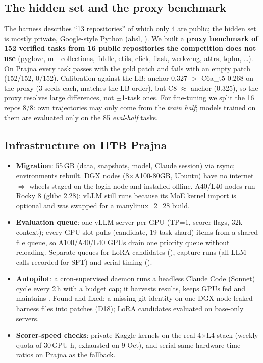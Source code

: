 \subsection{The hidden set and the proxy benchmark}
The harness describes ``13 repositories'' of which only 4 are public; the hidden set is mostly private, Google-style Python
(absl, ). We built a \textbf{proxy benchmark of 152 verified tasks from 16 public repositories the competition does
not use} (pyglove, ml\_collections, fiddle, etils, click, flask, werkzeug, attrs, tqdm, \dots). On Prajna every task passes with the gold
patch and fails with an empty patch (152/152, 0/152). Calibration against the LB: anchor 0.327 $>$ C6a\_t5 0.268 on the proxy (3
seeds each, matches the LB order), but C8 $\approx$ anchor (0.325), so the proxy resolves large differences, not $\pm$1-task ones.
For fine-tuning we split the 16 repos 8/8: own trajectories may only come from the \emph{train half}; models trained on them are
evaluated only on the 85 \emph{eval-half} tasks.

\subsection{Infrastructure on IITB Prajna}
\begin{itemize}
\item \textbf{Migration}: 55\,GB (data, snapshots, model, Claude session) via rsync; environments rebuilt. DGX nodes (8$\times$A100-80GB,
Ubuntu) have no internet $\Rightarrow$ wheels staged on the login node and installed offline. A40/L40 nodes run Rocky 8 (glibc 2.28):
vLLM still runs because its MoE kernel import is optional and  was swapped for a manylinux\_2\_28 build.
\item \textbf{Evaluation queue}: one vLLM server per GPU (TP=1, scorer flags, 32k context); every GPU slot pulls
(candidate, 19-task shard) items from a shared file queue, so A100/A40/L40 GPUs drain one priority queue without reloading.
Separate queues for LoRA candidates (), capture runs (all LLM calls recorded for SFT) and serial timing ().
\item \textbf{Autopilot}: a cron-supervised daemon runs a headless Claude Code (Sonnet) cycle every 2\,h with a budget cap; it harvests
results, keeps GPUs fed and maintains . Found and fixed: a missing git identity on one DGX node leaked
harness files into patches (D18); LoRA candidates evaluated on base-only servers.
\item \textbf{Scorer-speed checks}: private Kaggle kernels on the real 4$\times$L4 stack (weekly quota of 30\,GPU-h, exhausted on 9 Oct),
and serial same-hardware time ratios on Prajna as the fallback.
\end{itemize}

